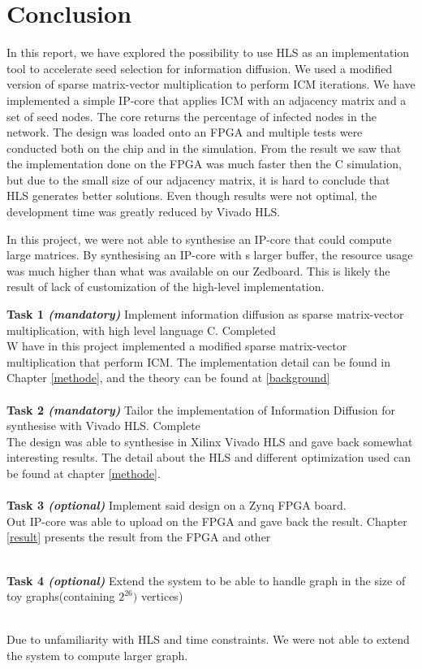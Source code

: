 \chapter{Conclusion}
In this report, we have explored the possibility to use HLS as an implementation tool to accelerate seed selection for information diffusion. We used a modified version of sparse matrix-vector multiplication to perform ICM iterations. We have implemented a simple IP-core that applies ICM with an adjacency matrix and a set of seed nodes. The core returns the percentage of infected nodes in the network. The design was loaded onto an FPGA and multiple tests were conducted both on the chip and in the simulation. From the result we saw that the implementation done on the FPGA was much faster then the C simulation, but due to the small size of our adjacency matrix, it is hard to conclude that HLS generates better solutions. Even though results were not optimal, the development time was greatly reduced by Vivado HLS. 

In this project, we were not able to synthesise an IP-core that could compute large matrices. By synthesising an  IP-core with s larger buffer, the resource usage was much higher than what was available on our Zedboard. This is likely the result of lack of customization of the high-level implementation.
 

\textbf{Task 1 \textit{(mandatory)}} Implement information diffusion as sparse matrix-vector multiplication, with high level language C. Completed
\\

W have in this project implemented a modified sparse matrix-vector multiplication that perform ICM. The implementation detail can be found in Chapter \ref{methode}, and the theory can be found at \ref{background}  \\ \hfil \\ \hfil
\textbf{Task 2 \textit{(mandatory)}} Tailor the implementation of Information Diffusion for synthesise with Vivado HLS. Complete \\

The design was able to synthesise in Xilinx Vivado HLS and gave back somewhat interesting results. The detail about the HLS and different optimization used can be found at chapter \ref{methode}.  \\ \hfil \\ \hfil
\textbf{Task 3 \textit{(optional)}} Implement said design on a  Zynq FPGA board.\\

Out IP-core was able to upload on the FPGA and gave back the result. Chapter \ref{result} presents the result from the FPGA and other 
 \\ \hfil \\ \hfil
 
\textbf{Task 4 \textit{(optional)}} Extend the system to be able to handle graph in the size of toy graphs(containing $2^{26})$ vertices) \\ \hfil \\ \hfil

Due to unfamiliarity with HLS and time constraints. We were not able to extend the system to compute larger graph.  \\


